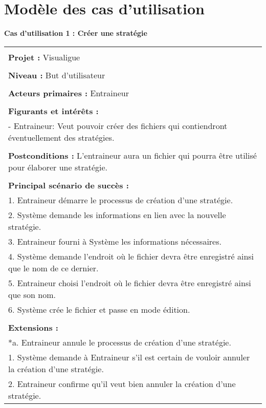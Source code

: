 \chapter{Modèle des cas d'utilisation}
\label{s:use_cases}
\newpage
\begin{flushleft}
	\textbf{Cas d'utilisation 1 : Créer une stratégie}\\
\end{flushleft}
\begin{tabular}{|p{16cm}|}
	\hline
	\\
	\textbf{Projet :} Visualigue\\
	\\
	\textbf{Niveau :} But d'utilisateur\\
	\\
	\textbf{Acteurs primaires :} Entraineur\\
	\\
	\textbf{Figurants et intérêts :} \\
	- Entraineur: Veut pouvoir créer des fichiers qui contiendront éventuellement des stratégies.\\
	\\
	\textbf{Postconditions :} L'entraineur aura un fichier qui pourra être utilisé pour élaborer une stratégie.\\
	\\
	\textbf{Principal scénario de succès :}\\
	1. Entraineur démarre le processus de création d'une stratégie.\\
	2. Système demande les informations en lien avec la nouvelle stratégie.\\
	3. Entraineur fourni à Système les informations nécessaires.\\
	4. Système demande l'endroit où le fichier devra être enregistré ainsi que le nom de ce dernier.\\
	5. Entraineur choisi l'endroit où le fichier devra être enregistré ainsi que son nom.\\
	6. Système crée le fichier et passe en mode édition.\\
	\\
	\textbf{Extensions :}\\
	*a. Entraineur annule le processus de création d'une stratégie.\\
	\hspace{1cm}1. Système demande à Entraineur s'il est certain de vouloir annuler la création d'une stratégie.\\
	\hspace{1cm}2. Entraineur confirme qu'il veut bien annuler la création d'une stratégie.\\

\end{tabular}
